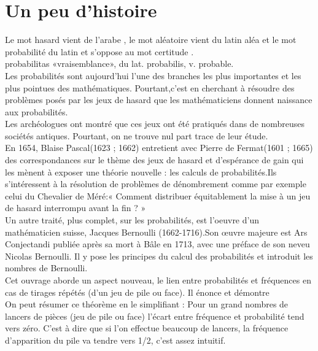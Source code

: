 \documentclass[10pt,a4paper]{article}
\theoremstyle{break}
\begin{document}
	
	\begin{center}
		\shadowbox{\begin{large}
				\textcolor{black}{VARIABLE ALÉATOIRE, LOI de Bernoulli}
			\end{large}}
		\end{center}
	\tableofcontents

\section{Un peu d'histoire}
Le mot hasard vient de l'arabe , le mot aléatoire vient du latin aléa  et le mot probabilité du latin et s'oppose au mot certitude .\\
 probabilitas «vraisemblance», du lat. probabilis, v. probable.\\
Les probabilités sont aujourd'hui l'une des branches les plus importantes et les plus pointues des mathématiques. Pourtant,c'est en cherchant à résoudre des problèmes posés par les jeux de hasard que les mathématiciens donnent naissance aux probabilités.\\

Les archéologues ont montré que ces jeux ont été pratiqués dans de nombreuses sociétés antiques. Pourtant, on ne trouve nul part trace de leur étude.\\

En 1654, Blaise Pascal(1623 ; 1662) entretient avec Pierre de Fermat(1601 ; 1665) des correspondances sur le thème des jeux de hasard et d'espérance de gain qui les mènent à exposer une théorie nouvelle : les calculs de probabilités.Ils s’intéressent à la résolution de problèmes de dénombrement comme par exemple celui du Chevalier de Méré:« Comment distribuer équitablement la mise à un jeu de hasard interrompu avant la fin ? »\\
Un autre traité, plus complet, sur les probabilités, est l'oeuvre d'un mathématicien suisse, Jacques Bernoulli (1662-1716).Son œuvre majeure est Ars Conjectandi publiée après sa mort à Bâle en 1713, avec une préface de son neveu Nicolas Bernoulli. Il y pose les principes du calcul des probabilités et introduit les nombres de Bernoulli.\\
Cet ouvrage aborde un aspect nouveau, le lien entre probabilités et fréquences en cas de tirages répétés (d'un jeu de pile ou face). Il énonce et démontre \\

On peut résumer ce théorème en le simplifiant : Pour un grand nombres de lancers de pièces (jeu de pile ou face) l'écart entre fréquence et probabilité tend vers zéro. C'est à dire que si l'on effectue beaucoup de lancers, la fréquence d'apparition du pile va tendre vers 1/2, c'est assez intuitif.\\
\newpage
\end{document}
